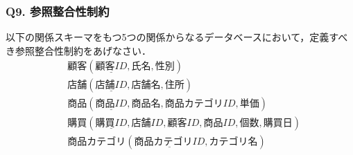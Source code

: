 \subsubsection{Q9. 参照整合性制約}
以下の関係スキーマをもつ5つの関係からなるデータベースにおいて，定義すべき参照整合性制約をあげなさい．
\begin{align}
&\textbf{顧客}(\underline{顧客ID}, 氏名, 性別) \\
&\textbf{店舗}(\underline{店舗ID}, 店舗名, 住所) \\
&\textbf{商品}(\underline{商品ID}, 商品名, 商品カテゴリID, 単価) \\
&\textbf{購買}(\underline{購買ID}, 店舗ID, 顧客ID, 商品ID, 個数, 購買日) \\
&\textbf{商品カテゴリ}(\underline{商品カテゴリID}, カテゴリ名)
\end{align}
